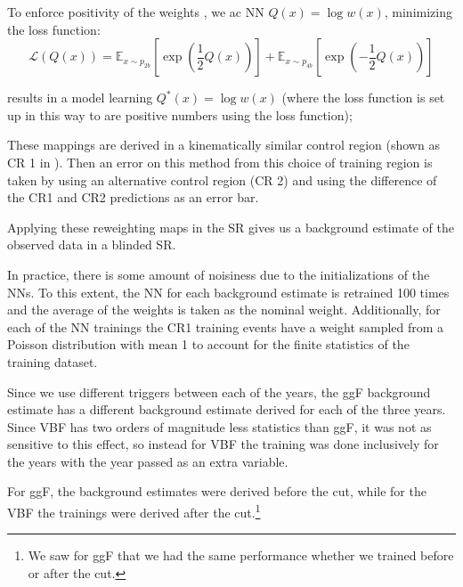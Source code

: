 To enforce positivity of  the weights , we ac NN $Q(x) = \log w(x)$, minimizing the loss function: 
\begin{equation}
	\mathcal{L}(Q(x)) = \mathbb{E}_{x\sim p_{2b}} \left[ \exp\left(  \frac{1}{2} Q(x) \right) \right] + \mathbb{E}_{x\sim p_{4b}} \left[ \exp\left(  - \frac{1}{2} Q(x) \right) \right]
\end{equation}

results in a model learning $Q^*(x) = \log w(x)$ (where the loss function is set up in this way to  are positive numbers using the loss function);

These mappings are derived in a kinematically similar control region (shown as CR 1 in \Fig{\ref{fig:ggF-massplanes-allYrs-dat-4b-preXwt}}). Then an error on this method from this choice of training region is taken by using an alternative control region (CR 2) and using the difference of the CR1 and CR2 predictions as an error bar.

Applying these reweighting maps in the SR gives us a background estimate of the observed data in a blinded SR.

In practice, there is some amount of noisiness due to the initializations of the NNs. To this extent, the NN for each background estimate is retrained 100 times and the average of the weights is taken as the nominal weight.
Additionally, for each of the NN trainings the CR1 training events have a weight sampled from a Poisson distribution with mean 1 to account for the finite statistics of the training dataset.

Since we use different triggers between each of the years, the ggF background estimate has a different background estimate derived for each of the three years. Since VBF has two orders of magnitude less statistics than ggF, it was not as sensitive to this effect, so instead for VBF the training was done inclusively for the years with the year passed as an extra variable.

For ggF, the background estimates were derived before the \Xwt cut, while for the VBF the trainings were derived after the \Xwt cut.\footnote{We saw for ggF that we had the same performance whether we trained before or after the \Xwt cut.}
 


